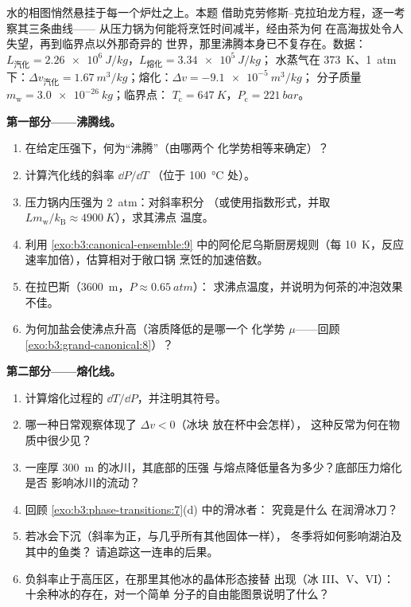 \begin{problem}\label{pb:b3:phase-transitions:1}
水的相图悄然悬挂于每一个炉灶之上。本题
借助克劳修斯–克拉珀龙方程，逐一考察其三条曲线——
从压力锅为何能将烹饪时间减半，经由茶为何
在高海拔处令人失望，再到临界点以外那奇异的
世界，那里沸腾本身已不复存在。数据：$L_{\text{汽化}}
= \qty{2.26e6}{J/kg}$，$L_{\text{熔化}} = \qty{3.34e5}{J/kg}$；
水蒸气在 \qty{373}{K}、\qty{1}{atm} 下：$\Delta v_{\text{汽化}}
= \qty{1.67}{m^3/kg}$；熔化：$\Delta v = \qty{-9.1e-5}{m^3/kg}$；
分子质量 $m_{\text{w}} = \qty{3.0e-26}{kg}$；临界点：
$T_{\text{c}} = \qty{647}{K}$，$P_{\text{c}} = \qty{221}{bar}$。

\medskip\noindent\textbf{第一部分——沸腾线。}
\begin{enumerate}
  \item 在给定压强下，何为“沸腾”（由哪两个
        化学势相等来确定）？
  \item 计算汽化线的斜率 $\dd P/\dd T$
        （位于 \qty{100}{\celsius} 处）。
  \item 压力锅内压强为 \qty{2}{atm}：对斜率积分
        （或使用指数形式，并取 $Lm_{\text{w}}/
        k_{\text{B}} \approx \qty{4900}{K}$），求其沸点
        温度。
  \item 利用
        \cref{exo:b3:canonical-ensemble:9} 中的阿伦尼乌斯厨房规则（每
        \qty{10}{K}，反应速率加倍），估算相对于敞口锅
        烹饪的加速倍数。
  \item 在拉巴斯（\qty{3600}{m}，$P \approx \qty{0.65}{atm}$）：
        求沸点温度，并说明为何茶的冲泡效果不佳。
  \item 为何加盐会使沸点升高（溶质降低的是哪一个
        化学势 $\mu$——回顾
        \cref{exo:b3:grand-canonical:8}）？
\end{enumerate}

\medskip\noindent\textbf{第二部分——熔化线。}
\begin{enumerate}[resume]
  \item 计算熔化过程的 $\dd T/\dd P$，并注明其符号。
  \item 哪一种日常观察体现了 $\Delta v < 0$（冰块
        放在杯中会怎样），
        这种反常为何在物质中很少见？
  \item 一座厚 \qty{300}{m} 的冰川，其底部的压强
        与熔点降低量各为多少？底部压力熔化是否
        影响冰川的流动？
  \item 回顾 \cref{exo:b3:phase-transitions:7}(d) 中的滑冰者：
        究竟是什么
        在润滑冰刀？
  \item 若冰会下沉（斜率为正，与几乎所有其他固体一样），
        冬季将如何影响湖泊及其中的鱼类？
        请追踪这一连串的后果。
  \item 负斜率止于高压区，在那里其他冰的晶体形态接替
        出现（冰 III、V、VI）：
        十余种冰的存在，对一个简单
        分子的自由能图景说明了什么？
\end{enumerate}


\end{problem}
